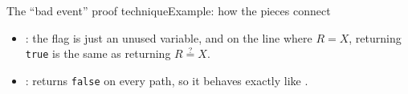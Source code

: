 \ifdefined\PRESENTATION\else\PassOptionsToClass{handout}{beamer}\fi\documentclass[aspectratio=169, lualatex]{beamer}
\begin{document}
\begin{frame}{The ``bad event'' proof technique}{Example: how the pieces connect}
	\begin{itemize}
		\item {} \interchangeable{} : the flag is just an unused variable, and on the line where $R = X$, returning \texttt{true} is the same as returning $R \stackrel{?}{=} X$.
		\item {} \interchangeable{} :  returns \texttt{false} on every path, so it behaves exactly like .
	\end{itemize}
	\begin{center}
	\end{center}
\end{frame}
\end{document}

